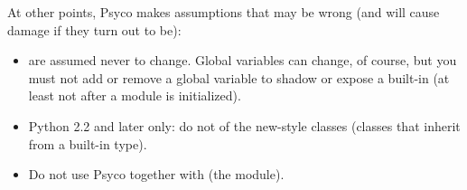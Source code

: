 \documentclass{manual}
\begin{document}
At other points, Psyco makes assumptions that may be wrong (and will cause damage if they turn out to be):
%
%
\begin{itemize}
  
\item {} are assumed never to change.  Global variables can change, of course, but you must not add or remove a global variable to shadow or expose a built-in (at least not after a module is initialized).

\item Python 2.2 and later only: do not  of the new-style classes (classes that inherit from a built-in type).
  
\item Do not use Psyco together with  (the  module).

\end{itemize}
\end{document}
